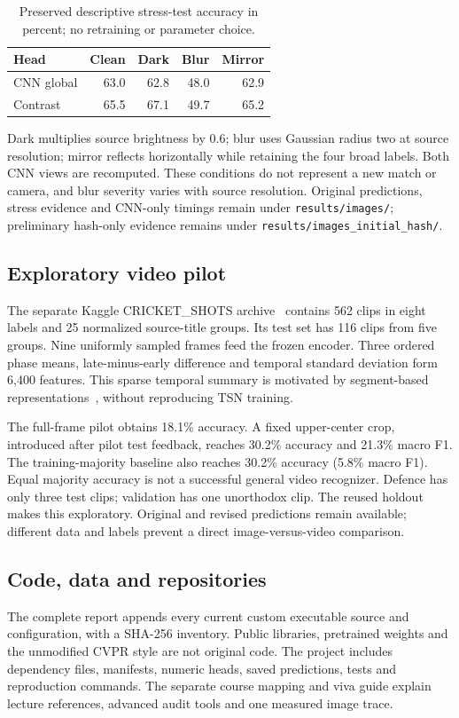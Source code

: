 \begin{table}[h]
\centering\small
\begin{tabular}{lrrrr}
\toprule
Head & Clean & Dark & Blur & Mirror \\
\midrule
CNN global & 63.0 & 62.8 & 48.0 & 62.9 \\
Contrast & 65.5 & 67.1 & 49.7 & 65.2 \\
\bottomrule
\end{tabular}
\caption{Preserved descriptive stress-test accuracy in percent; no retraining or parameter choice.}
\label{tab:stress}
\end{table}

Dark multiplies source brightness by 0.6; blur uses Gaussian radius two at source resolution; mirror reflects horizontally while retaining the four broad labels. Both CNN views are recomputed. These conditions do not represent a new match or camera, and blur severity varies with source resolution. Original predictions, stress evidence and CNN-only timings remain under \texttt{results/images/}; preliminary hash-only evidence remains under \texttt{results/images\_initial\_hash/}.

\subsection{Exploratory video pilot}\label{app:video}
The separate Kaggle CRICKET\_SHOTS archive~\cite{dataset} contains 562 clips in eight labels and 25 normalized source-title groups. Its test set has 116 clips from five groups. Nine uniformly sampled frames feed the frozen encoder. Three ordered phase means, late-minus-early difference and temporal standard deviation form 6,400 features. This sparse temporal summary is motivated by segment-based representations~\cite{wang}, without reproducing TSN training.

The full-frame pilot obtains 18.1\% accuracy. A fixed upper-center crop, introduced after pilot test feedback, reaches 30.2\% accuracy and 21.3\% macro F1. The training-majority baseline also reaches 30.2\% accuracy (5.8\% macro F1). Equal majority accuracy is not a successful general video recognizer. Defence has only three test clips; validation has one unorthodox clip. The reused holdout makes this exploratory. Original and revised predictions remain available; different data and labels prevent a direct image-versus-video comparison.

\subsection{Code, data and repositories}
The complete report appends every current custom executable source and configuration, with a SHA-256 inventory. Public libraries, pretrained weights and the unmodified CVPR style are not original code. The project includes dependency files, manifests, numeric heads, saved predictions, tests and reproduction commands. The separate course mapping and viva guide explain lecture references, advanced audit tools and one measured image trace.

